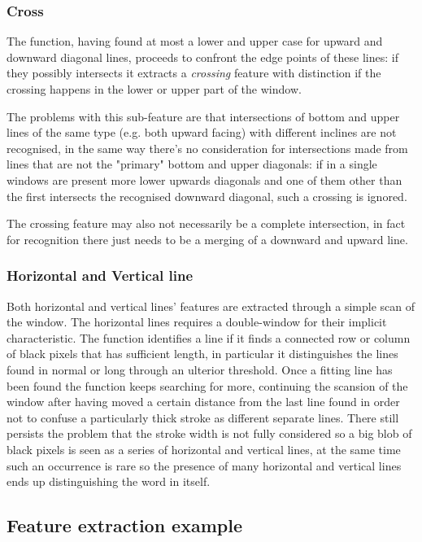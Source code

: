 \subsubsection{Cross}
The function, having found at most a lower and upper case for upward and downward diagonal lines, proceeds to confront the edge points of these lines: if they possibly intersects it extracts a \emph{crossing} feature with distinction if the crossing happens in the lower or upper part of the window. 

The problems with this sub-feature are that intersections of bottom and upper lines of the same type (e.g. both upward facing) with different inclines are not recognised, in the same way there's no consideration for intersections made from lines that are not the "primary" bottom and upper diagonals: if in a single windows are present more lower upwards diagonals and one of them other than the first intersects the recognised downward diagonal, such a crossing is ignored.

The crossing feature may also not necessarily be a complete intersection, in fact for recognition there just needs to be a merging of a downward and upward line. 


\subsubsection{Horizontal and Vertical line}
Both horizontal and vertical lines' features are extracted through
a simple scan of the window.
The horizontal lines requires a double-window for their implicit characteristic.
The function identifies a line if it finds a connected row or column of black pixels that has sufficient length, in particular it distinguishes the lines found in normal or long through an ulterior threshold.
Once a fitting line has been found the function keeps searching for more, continuing the scansion of the window after having moved a certain distance from the last line found in order not to confuse a particularly thick stroke as different separate lines.
There still persists the problem that the stroke width is not fully considered so a big blob of black pixels is seen as a series of horizontal and vertical lines, at the same time such an occurrence is rare so the presence of many horizontal and vertical lines ends up distinguishing the word in itself.    

\subsection{Feature extraction example}

